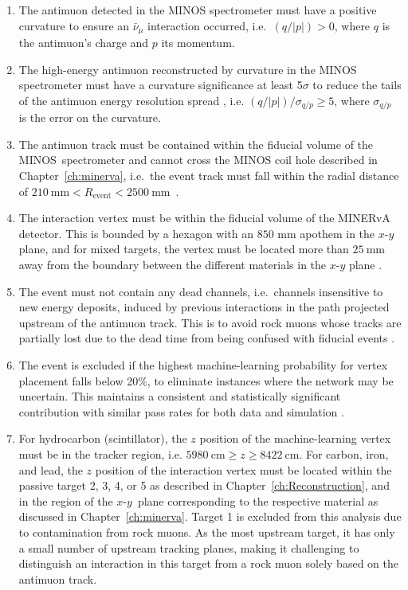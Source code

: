 \begin{enumerate}
    \item The antimuon detected in the MINOS spectrometer must have a positive curvature to ensure an $\bar{\nu}_{\mu}$ interaction occurred, i.e.~$(q/\lvert p \rvert) > 0$, where $q$ is the antimuon's charge and $p$ its momentum.
    \item The high-energy antimuon reconstructed by curvature in the MINOS spectrometer must have a curvature significance at least 5$\sigma$ to reduce the tails of the antimuon energy resolution spread \cite{Joel_HighMomMuons}, i.e. $(q/\lvert p \rvert)/\sigma_{q/p} \geq 5$, where $\sigma_{q/p}$ is the error on the curvature.
    \item The antimuon track must be contained within the fiducial volume of the MINOS~spec\-trometer and cannot cross the MINOS coil hole described in Chapter~\ref{ch:minerva}, i.e.~the event track must fall within the radial distance of \mbox{$210~\text{mm} < R_{\text{event}} < 2500~\text{mm}$ \cite{Joel_HighMomMuons, MINOS:1998kez}.}
    \item The interaction vertex must be within the fiducial volume of the MINERvA detector. This is bounded by a hexagon with an $850$ mm apothem in the $x$-$y$ plane, and for mixed targets, the vertex must be located more than $25~\text{mm}$ away from the boundary between the different materials in the $x$-$y$ plane \cite{Aliaga_2014}.
    \item The event must not contain any dead channels, i.e.~channels insensitive to new energy deposits, induced by previous interactions in the path projected upstream of the antimuon track. This is to avoid rock muons whose tracks are partially lost due to the dead time from being confused with fiducial events \cite{Aliaga_2014}.
    \item The event is excluded if the highest machine-learning probability for vertex placement falls below 20\%, to eliminate instances where the network may be uncertain. This maintains a consistent and statistically significant contribution with similar pass rates for both data and simulation \cite{Klustova_MLsys}.
    \item For hydrocarbon (scintillator), the $z$ position of the machine-learning vertex must be in the tracker region, i.e. $5980~\text{cm} \geq z \geq 8422~\text{cm}$. For carbon, iron, and lead, the $z$ position of the interaction vertex must be located within the passive target 2, 3, 4, or 5 as described in Chapter~\ref{ch:Reconstruction}, and in the region of the $x$-$y$~plane corresponding to the respective material as discussed in Chapter~\ref{ch:minerva}. Target 1 is excluded from this analysis due to contamination from rock muons. As the most upstream target, it has only a small number of upstream tracking planes, making it challenging to distinguish an interaction in this target from a rock muon solely based on the antimuon track.

\end{enumerate}
